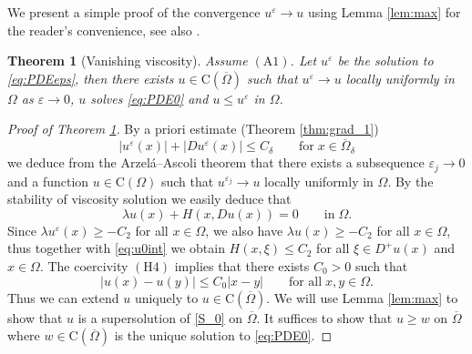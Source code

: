 \documentclass[11pt,reqno]{amsart}
\numberwithin{figure}{section}
\theoremstyle{plain}
\newtheorem{thm}{Theorem}[section]
\theoremstyle{remark}
\numberwithin{equation}{section}
\newcommand{\rmC}{\mathrm{C}}
\begin{document}
We present a simple proof of the convergence $u^\varepsilon \to u$ using Lemma \ref{lem:max} for the reader's convenience, see also \cite[Theorem VII.3]{Capuzzo-Dolcetta1990}.
\begin{thm}[Vanishing viscosity]\label{thm:qual} Assume $\mathrm{(A1)}$. Let $u^\varepsilon$ be the solution to \eqref{eq:PDEeps}, then there exists $u \in \mathrm{C}(\overline{\Omega})$ such that $u^\varepsilon \rightarrow u$ locally uniformly in $\Omega$ as $\varepsilon\rightarrow 0$, $u$ solves \eqref{eq:PDE0} and $u \leq u^\varepsilon$ in $\Omega$.
\end{thm}

\begin{proof}[Proof of Theorem \ref{thm:qual}] By a priori estimate (Theorem \ref{thm:grad_1})
\begin{equation}\label{e:priorie_eps}
    |u^\varepsilon(x)| + |Du^\varepsilon(x)| \leq C_\delta \qquad\text{for}\;x\in \overline{\Omega}_\delta
\end{equation}
we deduce from the Arzel\'a--Ascoli theorem that there exists a subsequence $\varepsilon_j\to 0$ and a function $u\in \rmC(\Omega)$ such that $u^{\varepsilon_j}\to u$ locally uniformly in $\Omega$. By the stability of viscosity solution we easily deduce that 
\begin{equation}\label{eq:u0int}
   \lambda u(x) + H(x,Du(x)) = 0 \qquad\text{in}\;\Omega.
\end{equation}
Since $\lambda u^\varepsilon(x)\geq -C_2$ for all $x\in \Omega$, we also have $\lambda u(x)\geq -C_2$ for all $x\in \Omega$, thus together with \eqref{eq:u0int} we obtain $H(x,\xi) \leq C_2$ for all $\xi\in D^+u(x)$ and $x\in \Omega$. The coercivity $\mathrm{(H4)}$ implies that there exists $C_0>0$ such that 
\begin{equation*}
    |u(x) - u(y)| \leq C_0|x-y| \qquad\text{for all}\;x,y\in \Omega.
\end{equation*}
Thus we can extend $u$ uniquely to $u\in \rmC(\overline{\Omega})$. We will use Lemma \ref{lem:max} to show that $u$ is a supersolution of \eqref{S_0} on $\overline{\Omega}$. It suffices to show that $u\geq w$ on $\overline{\Omega}$ where $w\in \rmC(\overline{\Omega})$ is the unique solution to \eqref{eq:PDE0}.


\end{proof}
\end{document}
